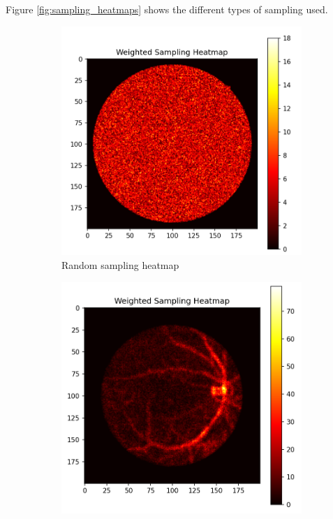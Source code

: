 Figure \ref{fig:sampling_heatmaps} shows the different types of sampling used.

\begin{figure}[tbp]
    \centering
    \begin{subfigure}[b]{0.3\textwidth}
        \centering
        \includegraphics[width=\textwidth]{imaxes/muestraje/random_sampling_heatmap.png}
        \caption{Random sampling heatmap}
        \label{fig:random_sampling_heatmap}
    \end{subfigure}
    \hfill
    \begin{subfigure}[b]{0.3\textwidth}
        \centering
        \includegraphics[width=\textwidth]{imaxes/muestraje/weighted_sampling_heatmap.png}

\end{subfigure}
\end{figure}
